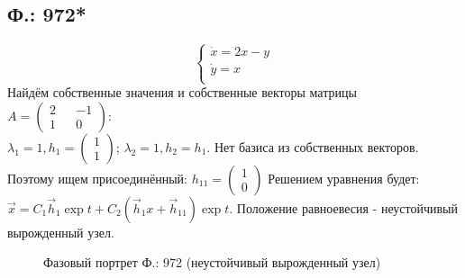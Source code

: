 \documentclass{article}
\begin{document}
\subsection{Ф.: 972*}
\begin{equation}
\begin{cases}
        \dot{x}=2x-y\\
        \dot{y}=x\\
    \end{cases}    
\end{equation}
Найдём собственные значения и собственные векторы матрицы $A=\begin{pmatrix}2 && -1 \\ 1 && 0 \end{pmatrix}$:\\
 $\lambda_1= 1,h_1 = \begin{pmatrix}1  \\  1 \end{pmatrix} $; $\lambda_2= 1,h_2 = h_1$. Нет базиса из собственных векторов. Поэтому ищем присоединённый: $h_{11} =\begin{pmatrix}1  \\  0 \end{pmatrix} $ Решением уравнения будет: $\vec x= C_1 \vec h_1 \exp{t}+C_2 ( \vec h_1 x + \vec h_{11})\exp{t}$. Положение равноевесия - неустойчивый вырожденный узел. 
 \begin{figure}[ht]
\caption{Фазовый портрет Ф.: 972 (неустойчивый вырожденный узел) }
\label{972}
\end{figure}
\end{document}
